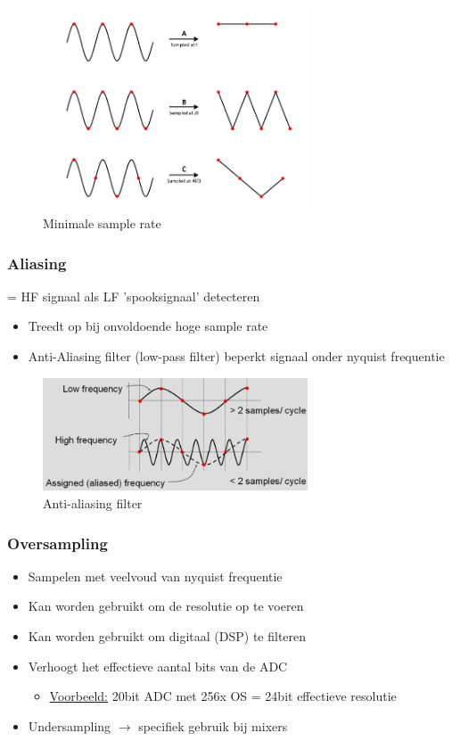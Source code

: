 \documentclass{article}
\begin{document}
\begin{figure}[H]
    \centering
    \includegraphics[width=0.7\textwidth]{Screenshot_20200224_121935.png}
    \caption{Minimale sample rate}
\end{figure}

\subsubsection{Aliasing}
= HF signaal als LF 'spooksignaal' detecteren 
\begin{itemize}
    \item Treedt op bij onvoldoende hoge sample rate
    \item Anti-Aliasing filter (low-pass filter) beperkt signaal onder nyquist frequentie
\end{itemize}

\begin{figure}[H]
    \centering
    \includegraphics[width=0.7\textwidth]{Screenshot_20200224_122204.png}
    \caption{Anti-aliasing filter}
\end{figure}

\subsubsection{Oversampling}
\begin{itemize}
    \item Sampelen met veelvoud van nyquist frequentie
    \item Kan worden gebruikt om de resolutie op te voeren
    \item Kan worden gebruikt om digitaal (DSP) te filteren
    \item Verhoogt het effectieve aantal bits van de ADC
    \begin{itemize}
        \item \underline{Voorbeeld:} 20bit ADC met 256x OS = 24bit effectieve resolutie
    \end{itemize}
    \item Undersampling $\rightarrow$ specifiek gebruik bij mixers
\end{itemize}
\end{document}
